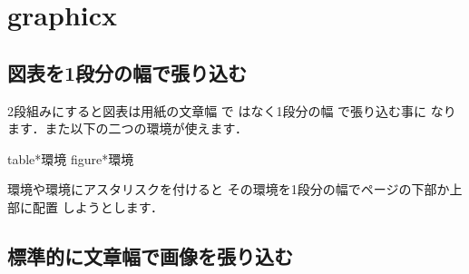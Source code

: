 \section{graphicx}

\begin{center}
\end{center}

\begin{center}
\end{center}

\begin{center}
\end{center}

\begin{center}
\end{center}

\begin{center}
\end{center}

\begin{center}
\end{center}


\subsection{図表を1段分の幅で張り込む}

2段組みにすると図表は用紙の文章幅 で
はなく1段分の幅 で張り込む事に
なります．また以下の二つの環境が使えます．
\begin{usage}
table*環境
figure*環境 
\end{usage}
環境や環境にアスタリスクを付けると
その環境を1段分の幅でページの下部か上部に配置
しようとします．

\subsection{標準的に文章幅で画像を張り込む}


